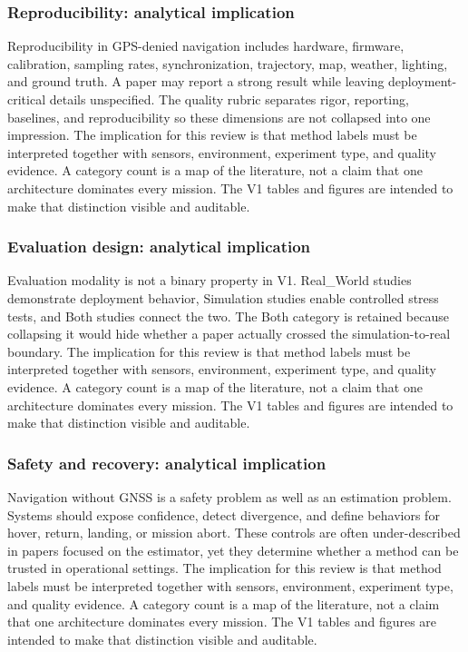 \documentclass[
  journal,
  10pt]{IEEEtran}
\begin{document}
\subsubsection{Reproducibility: analytical
implication}\label{reproducibility-analytical-implication-1}

Reproducibility in GPS-denied navigation includes hardware, firmware,
calibration, sampling rates, synchronization, trajectory, map, weather,
lighting, and ground truth. A paper may report a strong result while
leaving deployment-critical details unspecified. The quality rubric
separates rigor, reporting, baselines, and reproducibility so these
dimensions are not collapsed into one impression. The implication for
this review is that method labels must be interpreted together with
sensors, environment, experiment type, and quality evidence. A category
count is a map of the literature, not a claim that one architecture
dominates every mission. The V1 tables and figures are intended to make
that distinction visible and auditable.

\subsubsection{Evaluation design: analytical
implication}\label{evaluation-design-analytical-implication-1}

Evaluation modality is not a binary property in V1. Real\_World studies
demonstrate deployment behavior, Simulation studies enable controlled
stress tests, and Both studies connect the two. The Both category is
retained because collapsing it would hide whether a paper actually
crossed the simulation-to-real boundary. The implication for this review
is that method labels must be interpreted together with sensors,
environment, experiment type, and quality evidence. A category count is
a map of the literature, not a claim that one architecture dominates
every mission. The V1 tables and figures are intended to make that
distinction visible and auditable.

\subsubsection{Safety and recovery: analytical
implication}\label{safety-and-recovery-analytical-implication-1}

Navigation without GNSS is a safety problem as well as an estimation
problem. Systems should expose confidence, detect divergence, and define
behaviors for hover, return, landing, or mission abort. These controls
are often under-described in papers focused on the estimator, yet they
determine whether a method can be trusted in operational settings. The
implication for this review is that method labels must be interpreted
together with sensors, environment, experiment type, and quality
evidence. A category count is a map of the literature, not a claim that
one architecture dominates every mission. The V1 tables and figures are
intended to make that distinction visible and auditable.
\end{document}
